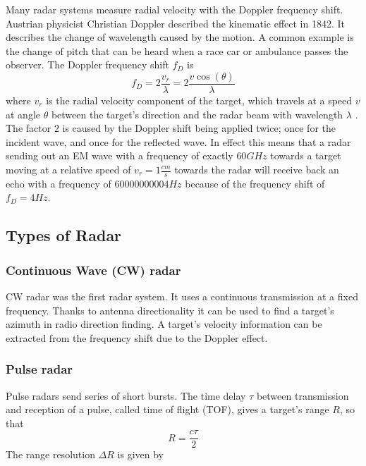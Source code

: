 Many radar systems measure radial velocity with the Doppler frequency
shift. Austrian physicist Christian Doppler described the kinematic
effect in 1842. It describes the change of wavelength caused by the
motion. A common example is the change of pitch that can be heard when a
race car or ambulance passes the observer. The Doppler frequency shift
\(f_D\) is
\begin{equation} \label{eq:doppler}
    f_D = 2 \frac{v_r}{\lambda} = 2 \frac{v \cos ( \theta )}{\lambda}
\end{equation}
where \(v_r\) is the radial velocity component of the target, which
travels at a speed \(v\) at angle \(\theta\) between the target's
direction and the radar beam with wavelength \(\lambda\)
\cite{Skolnik2008}. The factor \(2\) is caused by the Doppler shift
being applied twice; once for the incident wave, and once for the
reflected wave. In effect this means that a radar sending out an EM wave
with a frequency of exactly \(60GHz\) towards a target moving at a
relative speed of \(v_r = 1\frac{cm}{s}\) towards the radar will receive
back an echo with a frequency of \(60000000004 Hz\) because of the
frequency shift of \(f_D = 4 Hz\).

\subsection{Types of Radar}\label{types-of-radar}

\subsubsection{Continuous Wave (CW) radar}\label{continuous-wave-cw-radar}

CW radar was the first radar system. It uses a continuous transmission
at a fixed frequency. Thanks to antenna directionality it can be used to
find a target's azimuth in radio direction finding. A target's velocity
information can be extracted from the frequency shift due to the Doppler
effect.

\subsubsection{Pulse radar}\label{pulse-radar}

Pulse radars send series of short bursts. The time delay \(\tau\)
between transmission and reception of a pulse, called time of flight
(TOF), gives a target's range \(R\), so that 
\begin{equation} \label{eq:tof}
	 R = \frac{c\tau}{2} 
\end{equation}
The range resolution \(\Delta R\) is given by

